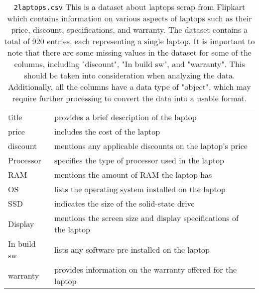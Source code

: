 \documentclass[12pt]{article}
\theoremstyle{remark}
\begin{document}
\begin{table}
	\caption{ \texttt{2laptops.csv}
This is a dataset about laptops scrap from Flipkart which contains information on various aspects of laptops such as their price, discount, specifications, and warranty. The dataset contains a total of 920 entries, each representing a single laptop. It is important to note that there are some missing values in the dataset for some of the columns, including "discount", "In build sw", and "warranty". This should be taken into consideration when analyzing the data. Additionally, all the columns have a data type of "object", which may require further processing to convert the data into a usable format.}
	\label{Gasoline}
	\begin{tabular}{l|l}\hline
	title & provides a brief description of the laptop \\
	price &   includes the cost of the laptop \\ 
	discount &  mentions any applicable discounts on the laptop's price\\
	Processor&  specifies the type of processor used in the laptop \\
	RAM &  mentions the amount of RAM the laptop has \\
	OS &  lists the operating system installed on the laptop \\
	SSD &  indicates the size of the solid-state drive\\
	Display &  mentions the screen size and display specifications of the laptop\\
	In build sw &  lists any software pre-installed on the laptop \\
	warranty &  provides information on the warranty offered for the laptop\\
	\hline
	\end{tabular}
\end{table}
\end{document}

